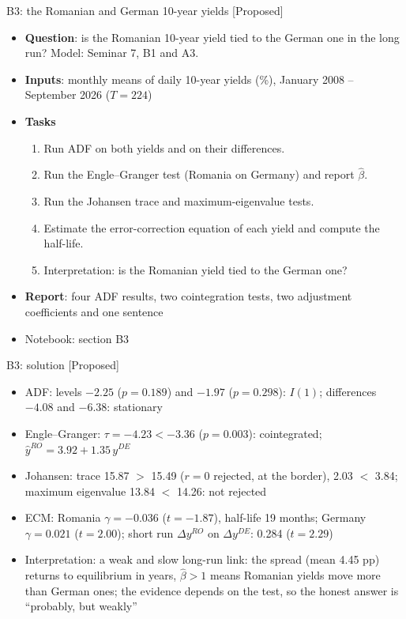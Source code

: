 \begin{frame}{B3: the Romanian and German 10-year yields [Proposed]}
\itemsize{\footnotesize}
\begin{itemize}
\item \textbf{Question}: is the Romanian 10-year yield tied to the German one in the long run? Model: Seminar 7, B1 and A3.
\item \textbf{Inputs}: monthly means of daily 10-year yields (\%), January 2008 -- September 2026 ($T = 224$)
\item \textbf{Tasks}
\begin{enumerate}
    \item Run ADF on both yields and on their differences.
    \item Run the Engle--Granger test (Romania on Germany) and report $\hat\beta$.
    \item Run the Johansen trace and maximum-eigenvalue tests.
    \item Estimate the error-correction equation of each yield and compute the half-life.
    \item Interpretation: is the Romanian yield tied to the German one?
\end{enumerate}
\item \textbf{Report}: four ADF results, two cointegration tests, two adjustment coefficients and one sentence
\item Notebook: section B3
\end{itemize}
\end{frame}

\ifsolutions
\begin{frame}{B3: solution [Proposed]}
\itemsize{\scriptsize}
\begin{itemize}
    \item ADF: levels $\ensuremath{-}2.25$ ($p = 0.189$) and $\ensuremath{-}1.97$ ($p = 0.298$): $I(1)$; differences $\ensuremath{-}4.08$ and $\ensuremath{-}6.38$: stationary
    \item Engle--Granger: $\tau = \ensuremath{-}4.23 < \ensuremath{-}3.36$ ($p = 0.003$): cointegrated; $\hat y^{RO} = 3.92 + 1.35\,y^{DE}$
    \item Johansen: trace 15.87 $>$ 15.49 ($r = 0$ rejected, at the border), 2.03 $<$ 3.84; maximum eigenvalue 13.84 $<$ 14.26: not rejected
    \item ECM: Romania $\gamma = \ensuremath{-}0.036$ ($t = \ensuremath{-}1.87$), half-life 19 months; Germany $\gamma = 0.021$ ($t = 2.00$); short run $\Delta y^{RO}$ on $\Delta y^{DE}$: 0.284 ($t = 2.29$)
    \item Interpretation: a weak and slow long-run link: the spread (mean 4.45 pp) returns to equilibrium in years, $\hat\beta > 1$ means Romanian yields move more than German ones; the evidence depends on the test, so the honest answer is ``probably, but weakly''
\end{itemize}
\end{frame}
\fi


